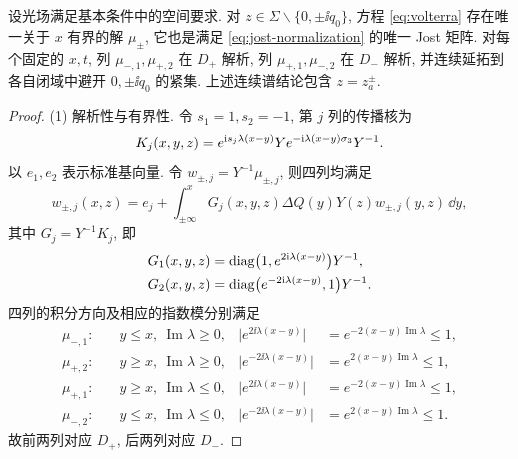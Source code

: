 \begin{theorem}\label{thm:jost}
设光场满足基本条件中的空间要求.
对 $z\in\Sigma\mathbin{\backslash}\{0,\pm\ii q_0\}$, 方程 \eqref{eq:volterra} 存在唯一关于 $x$ 有界的解 $\mu_\pm$,
它也是满足 \eqref{eq:jost-normalization} 的唯一 Jost 矩阵.
对每个固定的 $x,t$, 列 $\mu_{-,1},\mu_{+,2}$ 在 $D_+$ 解析, 列 $\mu_{+,1},\mu_{-,2}$ 在 $D_-$ 解析,
并连续延拓到各自闭域中避开 $0,\pm\ii q_0$ 的紧集. 上述连续谱结论包含 $z=z_a^\pm$.
\end{theorem}
\begin{proof}
(1) 解析性与有界性. 令 $s_1=1,s_2=-1$, 第 $j$ 列的传播核为
\begin{equation}\label{eq:columnkernel}
K_j(x,y,z)=e^{\mathrm{i} s_j\lambda(x-y)}Y e^{-\mathrm{i}\lambda(x-y)\sigma_3}Y^{-1}.
\end{equation}
以 $e_1,e_2$ 表示标准基向量. 令 $w_{\pm,j}=Y^{-1}\mu_{\pm,j}$, 则四列均满足
\begin{equation}\label{eq:jost-column-volterra}
w_{\pm,j}(x,z)=e_j+\int_{\pm\infty}^{x}
G_j(x,y,z)\Delta Q(y)Y(z)w_{\pm,j}(y,z)\,\dd y,
\end{equation}
其中 $G_j=Y^{-1}K_j$, 即
\begin{equation}\label{eq:jost-Gkernel}
\begin{aligned}
&G_1(x,y,z)=\operatorname{diag}\bigl(1,e^{2\mathrm{i}\lambda(x-y)}\bigr)Y^{-1},\\
&G_2(x,y,z)=\operatorname{diag}\bigl(e^{-2\mathrm{i}\lambda(x-y)},1\bigr)Y^{-1}.
\end{aligned}
\end{equation}
四列的积分方向及相应的指数模分别满足
\begin{align*}
\mu_{-,1}:&\quad y\le x,\ \operatorname{Im}\lambda\ge0,
& \bigl|e^{2\ii\lambda(x-y)}\bigr|&=e^{-2(x-y)\operatorname{Im}\lambda}\le1,\\
\mu_{+,2}:&\quad y\ge x,\ \operatorname{Im}\lambda\ge0,
& \bigl|e^{-2\ii\lambda(x-y)}\bigr|&=e^{2(x-y)\operatorname{Im}\lambda}\le1,\\
\mu_{+,1}:&\quad y\ge x,\ \operatorname{Im}\lambda\le0,
& \bigl|e^{2\ii\lambda(x-y)}\bigr|&=e^{-2(x-y)\operatorname{Im}\lambda}\le1,\\
\mu_{-,2}:&\quad y\le x,\ \operatorname{Im}\lambda\le0,
& \bigl|e^{-2\ii\lambda(x-y)}\bigr|&=e^{2(x-y)\operatorname{Im}\lambda}\le1.
\end{align*}
故前两列对应 $D_+$, 后两列对应 $D_-$.


\end{proof}
